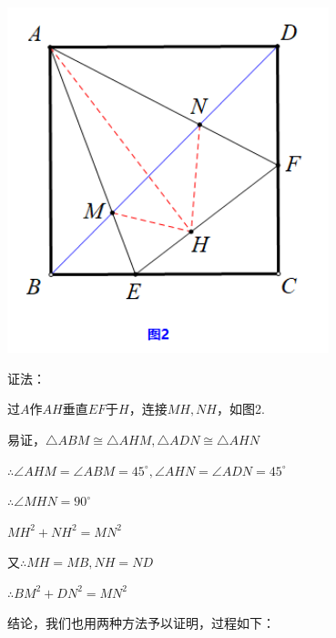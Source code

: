 \documentclass[10pt]{ctexart}
\begin{document}
{\begin{minipage}[h]{0.4\textwidth}
	\centering
	\includegraphics[width=0.7\textwidth]{figure/banjiao13}
\end{minipage}
\quad
\begin{minipage}[h]{0.6\textwidth}

证法：

过$A$作$AH$垂直$EF$于$H$，连接$MH,NH$，如图2.

易证，$\triangle ABM \cong \triangle AHM ,\triangle ADN \cong \triangle AHN$

$\therefore \angle AHM=\angle ABM=45^\circ,\angle AHN=\angle ADN=45^\circ$

$\therefore \angle MHN=90^\circ$

$MH^2+NH^2=MN^2$

又$\therefore MH=MB,NH=ND$

$\therefore BM^2+DN^2=MN^2$
\end{minipage}
}

结论，我们也用两种方法予以证明，过程如下：
\end{document}

